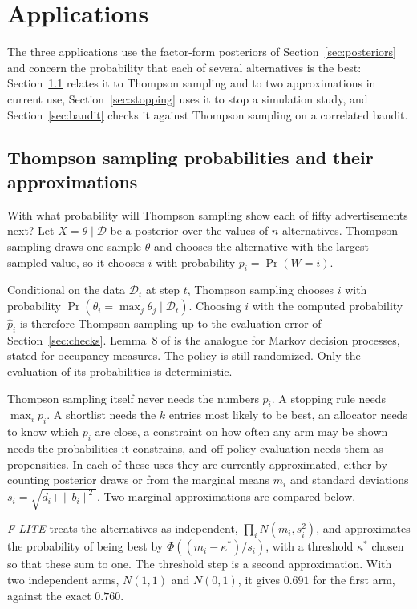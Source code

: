 \documentclass[11pt]{article}
\begin{document}
\section{Applications}
\label{sec:applications}

The three applications use the factor-form posteriors of
Section~\ref{sec:posteriors} and concern the probability that each of
several alternatives is the best: Section~\ref{sec:surrogates} relates
it to Thompson sampling and to two approximations in current use,
Section~\ref{sec:stopping} uses it to stop a simulation study, and
Section~\ref{sec:bandit} checks it against Thompson sampling on a
correlated bandit.

\subsection{Thompson sampling probabilities and their approximations}
\label{sec:surrogates}

With what probability will Thompson sampling show each of fifty
advertisements next? Let $X=\theta\mid\mathcal{D}$ be a posterior over the values of $n$
alternatives. Thompson sampling draws one sample $\tilde{\theta}$ and
chooses the alternative with the largest sampled value, so it chooses
$i$ with probability $p_i=\Pr(W=i)$.

Conditional on the data $\mathcal{D}_t$ at step $t$, Thompson
sampling chooses $i$ with probability
$\Pr(\theta_i=\max_j\theta_j\mid\mathcal{D}_t)$. Choosing $i$ with the
computed probability $\hat p_i$ is therefore Thompson sampling up to
the evaluation error of Section~\ref{sec:checks}. Lemma~8 of
\citet{tarbouriech2023} is the analogue for Markov decision
processes, stated for occupancy measures. The policy is still
randomized. Only the evaluation of its probabilities is
deterministic.

Thompson sampling itself never needs the numbers $p_i$. A stopping
rule needs $\max_i p_i$. A shortlist needs the $k$ entries
most likely to be best, an allocator needs to know which $p_i$ are
close, a constraint on how often any arm may be shown needs the
probabilities it constrains, and off-policy evaluation needs them as
propensities. In each of these uses they are currently approximated,
either by counting posterior draws or from the marginal means $m_i$
and standard deviations $s_i = \sqrt{d_i + \|b_i\|^2}$. Two marginal
approximations are compared below.

\emph{F-LITE} \citep{menet2025} treats the alternatives as
independent, $\prod_i N(m_i, s_i^2)$, and approximates the
probability of being best by $\Phi((m_i - \kappa^*)/s_i)$, with a
threshold $\kappa^*$ chosen so that these sum to one. The threshold
step is a second approximation. With two independent arms, $N(1,1)$
and $N(0,1)$, it gives $0.691$ for the first arm, against the exact
$0.760$.
\end{document}
